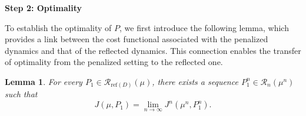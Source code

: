 \documentclass[11pt,amsfonts]{article}
\theoremstyle{plain}
\newtheorem{lemma}{Lemma}
\theoremstyle{assumpstyle}
\numberwithin{equation}{section}
\numberwithin{theorem}{section}
\numberwithin{proposition}{section}
\numberwithin{definition}{section}
\numberwithin{remark}{section}
\numberwithin{corollary}{section}
\numberwithin{lemma}{section}
\begin{document}
\noindent \textbf{Step 2: Optimality}

To establish the optimality of 
$ P$,
we first introduce the following lemma, which provides a link between the cost functional associated with the penalized dynamics and that of the reflected dynamics. 
This connection enables the transfer of optimality from the penalized setting to the reflected one.
\begin{lemma}\label{adjointlemma}
For every $ P_1 \in \mathcal{R}_{\mathrm{ref}(D)}(\mu)$, 
there exists a sequence 
$ P_1^{n} \in \mathcal{R}_n(\mu^n) $ such that
\begin{equation}\label{optimalestimation}
J(\mu, P_1)
= 
\lim_{n \to \infty} J^{n}(\mu^{n}, P_1^{n}).
\end{equation}
\end{lemma}
\end{document}
